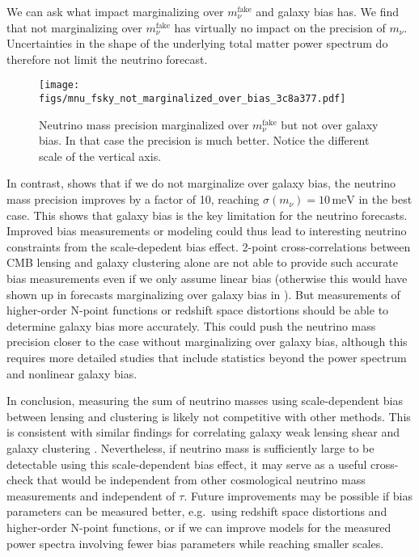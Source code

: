 \documentclass[prd,superscriptaddress,floatfix,notitlepage,nofootinbib,reprint]{revtex4-1} %
\begin{document}
We can ask what impact marginalizing over $m_\nu^\mathrm{fake}$ and galaxy bias has.
We find that not marginalizing over $m_\nu^\mathrm{fake}$ 
has virtually no impact on the precision  of $m_\nu$.
Uncertainties in the shape of the underlying total matter power spectrum do therefore not limit the neutrino forecast.

\begin{figure}[tbp]
\texttt{[image: figs/mnu\_fsky\_not\_marginalized\_over\_bias\_3c8a377.pdf]}
\caption{Neutrino mass precision marginalized over $m_\nu^\mathrm{fake}$ but not over galaxy bias. In that case the precision is much better. Notice the different scale of the vertical axis.
}
\label{fig:mnu_fsky_not_marginalizing_bias}
\end{figure}

In contrast,  shows that if we do not marginalize over galaxy bias, the neutrino mass precision improves by a factor of 10, reaching $\sigma(m_\nu)=10\,\mathrm{meV}$ in the best case.
This shows that galaxy bias is the key limitation for the neutrino forecasts.
Improved bias measurements or modeling could thus lead to interesting neutrino constraints from the scale-depedent bias effect. 
2-point cross-correlations between CMB lensing and galaxy clustering alone are not able to provide such accurate bias measurements even if we only assume linear bias (otherwise this would have shown up in forecasts marginalizing over galaxy bias in ).
But measurements of higher-order N-point functions or redshift space distortions should be able to determine galaxy bias more accurately.
This could push the neutrino mass precision closer to the case without marginalizing over galaxy bias, although this requires more detailed studies that include statistics beyond the power spectrum and nonlinear galaxy bias.




In conclusion, measuring the sum of neutrino masses using scale-dependent bias between lensing and clustering is likely not competitive with other methods.
This is consistent with similar findings for correlating galaxy weak lensing shear and galaxy clustering \cite{LoVerde1602}.
Nevertheless, if neutrino mass is sufficiently large to be detectable using this scale-dependent bias effect, it may serve as a useful cross-check that would be independent from other cosmological neutrino mass measurements and independent of $\tau$.
Future improvements may be possible if bias parameters can be measured better, e.g.~using redshift space distortions and higher-order N-point functions, or if we can improve models for the measured power spectra involving fewer bias parameters while reaching smaller scales.
\end{document}
